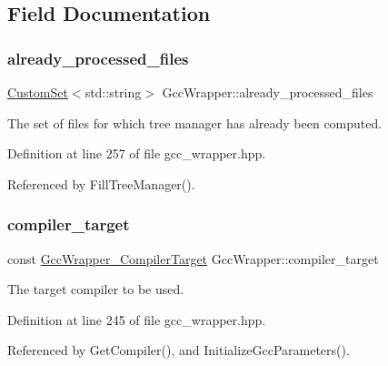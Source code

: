 \subsection{Field Documentation}
\mbox{\label{classGccWrapper_a87bb70af9d7789b3ac105df1c5c510b6}} 
\subsubsection{\texorpdfstring{already\+\_\+processed\+\_\+files}{already\_processed\_files}}
{\footnotesize\ttfamily \hyperlink{custom__set_8hpp_a615bc2f42fc38a4bb1790d12c759e86f}{Custom\+Set}$<$std\+::string$>$ Gcc\+Wrapper\+::already\+\_\+processed\+\_\+files\hspace{0.3cm}{\ttfamily [private]}}



The set of files for which tree manager has already been computed. 



Definition at line 257 of file gcc\+\_\+wrapper.\+hpp.



Referenced by Fill\+Tree\+Manager().

\mbox{\label{classGccWrapper_a1f804f17bfd3b629339dd13a908560dd}} 
\subsubsection{\texorpdfstring{compiler\+\_\+target}{compiler\_target}}
{\footnotesize\ttfamily const \hyperlink{gcc__wrapper_8hpp_abb9d9a5cb3a1bf5d402dbc841a6708aa}{Gcc\+Wrapper\+\_\+\+Compiler\+Target} Gcc\+Wrapper\+::compiler\+\_\+target\hspace{0.3cm}{\ttfamily [private]}}



The target compiler to be used. 



Definition at line 245 of file gcc\+\_\+wrapper.\+hpp.



Referenced by Get\+Compiler(), and Initialize\+Gcc\+Parameters().

